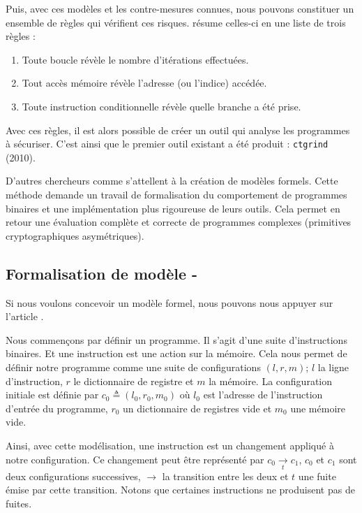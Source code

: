 Puis, avec ces modèles et les contre-mesures connues, nous pouvons constituer un ensemble de règles qui vérifient ces risques. \cite{CTsaferCrypto} résume celles-ci en une liste de trois règles :
\begin{enumerate}
  \item Toute boucle révèle le nombre d'itérations effectuées. 
  \item Tout accès mémoire révèle l'adresse (ou l'indice) accédée.
  \item Toute instruction conditionnelle révèle quelle branche a été prise.
\end{enumerate}

Avec ces règles, il est alors possible de créer un outil qui analyse les programmes à sécuriser. C'est ainsi que le premier outil existant a été produit : \texttt{ctgrind} (2010).\medbreak

D'autres chercheurs comme \citeauthor{binsecRel2019} \cite{binsecRel2019} s'attellent à la création de modèles formels. Cette méthode demande un travail de formalisation du comportement de programmes binaires et une implémentation plus rigoureuse de leurs outils. Cela permet en retour une évaluation complète et correcte de programmes complexes (\ie primitives cryptographiques asymétriques).

\subsection*{Formalisation de modèle - \cite{binsecRel2019}}

Si nous voulons concevoir un modèle formel, nous pouvons nous appuyer sur l'article  \cite{formalConstantTime}.\medbreak


Nous commençons par définir un programme. Il s'agit d'une suite d'instructions binaires. Et une instruction est une action sur la mémoire. Cela nous permet de définir notre programme comme une suite de configurations $(l,r,m)$; $l$ la ligne d'instruction, $r$ le dictionnaire de registre et $m$ la mémoire. La configuration initiale est définie par $c_0 \triangleq (l_0,r_0,m_0)$ où $l_0$ est l'adresse de l'instruction d'entrée du programme, $r_0$ un dictionnaire de registres vide et $m_0$ une mémoire vide.\smallbreak

Ainsi, avec cette modélisation, une instruction est un changement appliqué à notre configuration. Ce changement peut être représenté par $ c_0 \underset{t}{\to} c_1 $, $c_0$ et $c_1$ sont deux configurations successives, $\to$ la transition entre les deux et $t$ une fuite émise par cette transition. Notons que certaines instructions ne produisent pas de fuites.\smallbreak

